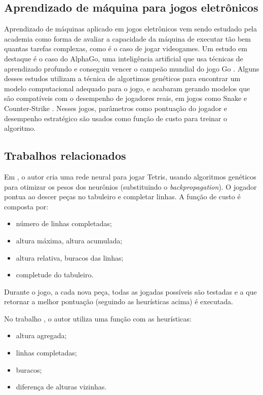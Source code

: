 \documentclass[conference]{IEEEtran}
\begin{document}
\subsection{Aprendizado de máquina para jogos eletrônicos}
Aprendizado de máquinas aplicado em jogos eletrônicos vem sendo estudado pela academia como forma de avaliar a capacidade da máquina de executar tão bem quantas tarefas complexas, como é o caso de jogar videogames. Um estudo em destaque é o caso do AlphaGo, uma inteligência artificial que usa técnicas de aprendizado profundo e conseguiu vencer o campeão mundial do jogo Go \cite{b5}. Alguns desses estudos utilizam a técnica de algortimos genéticos para encontrar um modelo computacional adequado para o jogo, e acabaram gerando modelos que são compatíveis com o desempenho de jogadores reais, em jogos como Snake \cite{b6} e Counter-Strike \cite{b7}. Nesses jogos, parâmetros como pontuação do jogador e desempenho estratégico são usados como função de custo para treinar o algoritmo.

\subsection{Trabalhos relacionados}
Em \cite{b8}, o autor cria uma rede neural para jogar Tetris, usando algoritmos genéticos para otimizar os pesos dos neurônios (substituindo o \textit{backpropagation}). O jogador pontua ao descer peças no tabuleiro e completar linhas. A função de custo é composta por:

\begin{itemize}
\item número de linhas completadas;
\item altura máxima, altura acumulada;
\item altura relativa, buracos das linhas;
\item completude do tabuleiro.
\end{itemize}

Durante o jogo, a cada nova peça, todas as jogadas possíveis são testadas e a que retornar a melhor pontuação (seguindo as heurísticas acima) é executada.

No trabalho \cite{b9}, o autor utiliza uma função com as heurísticas: 

\begin{itemize}
\item altura agregada;
\item linhas completadas;
\item buracos;
\item diferença de alturas vizinhas.
\end{itemize}
\end{document}
